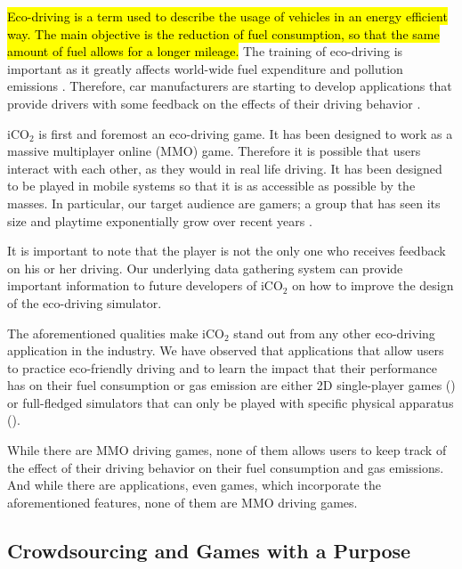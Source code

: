 \documentclass[preprint,authoryear,12pt]{elsarticle}
\newcommand{\hlc}[2][yellow]{ {\sethlcolor{#1} \hl{#2}} }
\begin{document}
\hlc[green]{
Eco-driving is a term used to describe the usage of vehicles in an energy efficient way. The main objective is the reduction of fuel consumption, so that the same amount of fuel allows for a longer mileage.
}
The training of eco-driving is important as it greatly affects world-wide fuel expenditure and pollution emissions \citep{barkenbus2010eco,shaheen2012ecodriving}. Therefore, car manufacturers are starting to develop applications that provide drivers with some feedback on the effects of their driving behavior \citep{EcoTools,FiatEcoGame}.

iCO$_2$ is first and foremost an eco-driving game. It has been designed to work as a massive multiplayer online (MMO) game. Therefore it is possible that users interact with each other, as they would in real life driving. It has been designed to be played in mobile systems so that it is as  accessible as possible by the masses. In particular, our target audience are gamers; a group that has seen its size and playtime exponentially grow over recent years \citep{MobileStats}.

It is important to note that the player is not the only one who receives feedback on his or her  driving. Our underlying data gathering system can provide important information to future developers of iCO$_2$ on how to improve the design of the eco-driving simulator.

The aforementioned qualities make iCO$_2$ stand out from any other eco-driving application in the industry.
We have observed that applications that allow users to practice eco-friendly driving and to learn the impact that their performance has on their fuel consumption or gas emission are either 2D single-player games (\cite{EcoGame1, EcoGame2, TruckEcoGame, Moebius, FiatEcoGame}) or full-fledged simulators that can only be played with specific physical apparatus (\cite{EcoSimulator, GreenDino, EcoSimulator2, sabrina2013enhanced}).

While there are MMO driving games, none of them allows users to keep track of the effect of their driving behavior on their fuel consumption and gas emissions. And while there are applications, even games, which incorporate the aforementioned features, none of them are MMO driving games.

\subsection{Crowdsourcing and Games with a Purpose}
\label{subsec:csandgwap}
\end{document}

